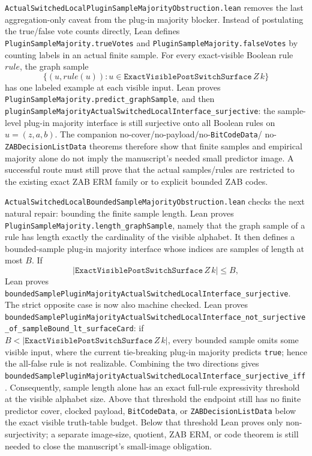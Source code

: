 \documentclass[11pt]{article}
\theoremstyle{remark}
\begin{document}
\texttt{ActualSwitchedLocalPluginSampleMajorityObstruction.lean} removes the
last aggregation-only caveat from the plug-in majority blocker.  Instead of
postulating the true/false vote counts directly, Lean defines
\texttt{PluginSampleMajority.trueVotes} and
\texttt{PluginSampleMajority.falseVotes} by counting labels in an actual finite
sample.  For every exact-visible Boolean rule \(rule\), the graph sample
\[
  \{(u,rule(u)) : u\in \texttt{ExactVisiblePostSwitchSurface}\,Z\,k\}
\]
has one labeled example at each visible input.  Lean proves
\texttt{PluginSampleMajority.predict\_graphSample}, and then
\texttt{pluginSampleMajorityActualSwitchedLocalInterface\_surjective}: the
sample-level plug-in majority interface is still surjective onto all Boolean
rules on \(u=(z,a,b)\).  The companion no-cover/no-payload/no-\texttt{BitCodeData}/
no-\texttt{ZABDecisionListData} theorems therefore show that finite samples and
empirical majority alone do not imply the manuscript's needed small predictor
image.  A successful route must still prove that the actual samples/rules are
restricted to the existing exact ZAB ERM family or to explicit bounded ZAB
codes.

\texttt{ActualSwitchedLocalBoundedSampleMajorityObstruction.lean} checks the
next natural repair: bounding the finite sample length.  Lean proves
\texttt{PluginSampleMajority.length\_graphSample}, namely that the graph sample
of a rule has length exactly the cardinality of the visible alphabet.  It then
defines a bounded-sample plug-in majority interface whose indices are samples
of length at most \(B\).  If
\[
  |\texttt{ExactVisiblePostSwitchSurface}\,Z\,k|\le B,
\]
Lean proves
\texttt{boundedSamplePluginMajorityActualSwitchedLocalInterface\_surjective}.
The strict opposite case is now also machine checked.  Lean proves
\texttt{boundedSamplePluginMajorityActualSwitchedLocalInterface\_not\_surjective\_of\_sampleBound\_lt\_surfaceCard}:
if \(B<|\texttt{ExactVisiblePostSwitchSurface}\,Z\,k|\), every bounded sample
omits some visible input, where the current tie-breaking plug-in majority
predicts \texttt{true}; hence the all-false rule is not realizable.  Combining
the two directions gives
\texttt{boundedSamplePluginMajorityActualSwitchedLocalInterface\_surjective\_iff}.
Consequently, sample length alone has an exact full-rule expressivity threshold
at the visible alphabet size.  Above that threshold the endpoint still has no
finite predictor cover, clocked payload, \texttt{BitCodeData}, or
\texttt{ZABDecisionListData} below the exact visible truth-table budget.  Below
that threshold Lean proves only non-surjectivity; a separate image-size,
quotient, ZAB ERM, or code theorem is still needed to close the manuscript's
small-image obligation.
\end{document}
